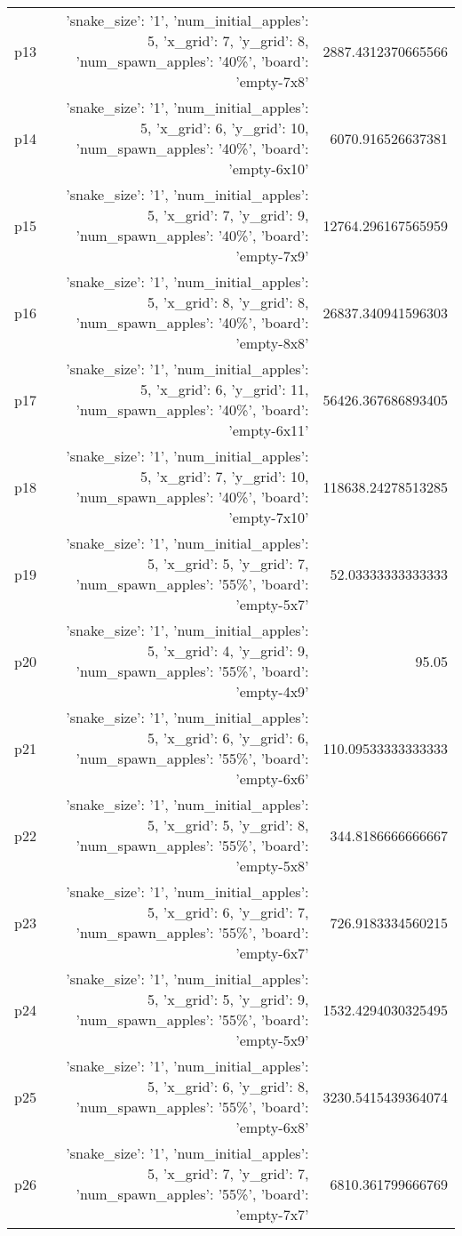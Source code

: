 \documentclass{article}
\begin{document}
\begin{center}
\begin{tabular}{r|r|r}
  p13&{'snake\_size': '1', 'num\_initial\_apples': 5, 'x\_grid': 7, 'y\_grid': 8, 'num\_spawn\_apples': '40\%', 'board': 'empty-7x8'}&2887.4312370665566\\
  p14&{'snake\_size': '1', 'num\_initial\_apples': 5, 'x\_grid': 6, 'y\_grid': 10, 'num\_spawn\_apples': '40\%', 'board': 'empty-6x10'}&6070.916526637381\\
  p15&{'snake\_size': '1', 'num\_initial\_apples': 5, 'x\_grid': 7, 'y\_grid': 9, 'num\_spawn\_apples': '40\%', 'board': 'empty-7x9'}&12764.296167565959\\
  p16&{'snake\_size': '1', 'num\_initial\_apples': 5, 'x\_grid': 8, 'y\_grid': 8, 'num\_spawn\_apples': '40\%', 'board': 'empty-8x8'}&26837.340941596303\\
  p17&{'snake\_size': '1', 'num\_initial\_apples': 5, 'x\_grid': 6, 'y\_grid': 11, 'num\_spawn\_apples': '40\%', 'board': 'empty-6x11'}&56426.367686893405\\
  p18&{'snake\_size': '1', 'num\_initial\_apples': 5, 'x\_grid': 7, 'y\_grid': 10, 'num\_spawn\_apples': '40\%', 'board': 'empty-7x10'}&118638.24278513285\\
  p19&{'snake\_size': '1', 'num\_initial\_apples': 5, 'x\_grid': 5, 'y\_grid': 7, 'num\_spawn\_apples': '55\%', 'board': 'empty-5x7'}&52.03333333333333\\
  p20&{'snake\_size': '1', 'num\_initial\_apples': 5, 'x\_grid': 4, 'y\_grid': 9, 'num\_spawn\_apples': '55\%', 'board': 'empty-4x9'}&95.05\\
  p21&{'snake\_size': '1', 'num\_initial\_apples': 5, 'x\_grid': 6, 'y\_grid': 6, 'num\_spawn\_apples': '55\%', 'board': 'empty-6x6'}&110.09533333333333\\
  p22&{'snake\_size': '1', 'num\_initial\_apples': 5, 'x\_grid': 5, 'y\_grid': 8, 'num\_spawn\_apples': '55\%', 'board': 'empty-5x8'}&344.8186666666667\\
  p23&{'snake\_size': '1', 'num\_initial\_apples': 5, 'x\_grid': 6, 'y\_grid': 7, 'num\_spawn\_apples': '55\%', 'board': 'empty-6x7'}&726.9183334560215\\
  p24&{'snake\_size': '1', 'num\_initial\_apples': 5, 'x\_grid': 5, 'y\_grid': 9, 'num\_spawn\_apples': '55\%', 'board': 'empty-5x9'}&1532.4294030325495\\
  p25&{'snake\_size': '1', 'num\_initial\_apples': 5, 'x\_grid': 6, 'y\_grid': 8, 'num\_spawn\_apples': '55\%', 'board': 'empty-6x8'}&3230.5415439364074\\
  p26&{'snake\_size': '1', 'num\_initial\_apples': 5, 'x\_grid': 7, 'y\_grid': 7, 'num\_spawn\_apples': '55\%', 'board': 'empty-7x7'}&6810.361799666769\\

\end{tabular}
\end{center}
\end{document}
